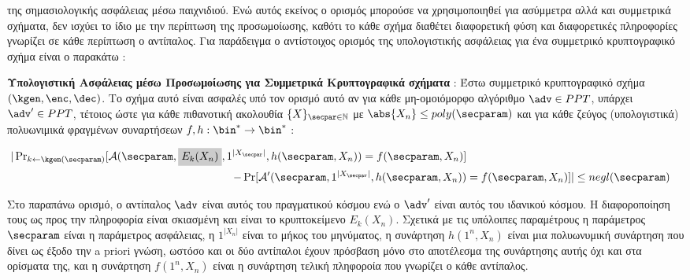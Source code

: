 της σημασιολογικής ασφάλειας μέσω παιχνιδιού. Ενώ αυτός εκείνος ο ορισμός μπορούσε να χρησιμοποιηθεί για ασύμμετρα αλλά και συμμετρικά σχήματα, δεν ισχύει το ίδιο με την περίπτωση της προσωμοίωσης, καθότι το κάθε σχήμα διαθέτει διαφορετική φύση και διαφορετικές πληροφορίες γνωρίζει σε κάθε περίπτωση ο αντίπαλος. Για παράδειγμα ο αντίστοιχος ορισμός της υπολογιστικής ασφάλειας για ένα συμμετρικό κρυπτογραφικό σχήμα είναι ο παρακάτω :

\begin{definition}
    \label{def:simulation_security_symmetric_scheme}
    \textbf{Υπολογιστική Ασφάλειας μέσω Προσωμοίωσης για Συμμετρικά Κρυπτογραφικά σχήματα} :  Έστω συμμετρικό κρυπτογραφικό σχήμα $(\kgen, \enc, \dec)$. Το σχήμα αυτό είναι ασφαλές υπό τον ορισμό αυτό αν για κάθε μη-ομοιόμορφο αλγόριθμο $\adv \in PPT$, υπάρχει $\adv' \in PPT$, τέτοιος ώστε για κάθε πιθανοτική ακολουθία $\{X\}_{\secpar \in \mathbb{N}}$  με $\abs{X_n} \le poly(\secparam)$ και για κάθε ζεύγος (υπολογιστικά) πολυωνιμικά φραγμένων συναρτήσεων $f, h : \bin^* \rightarrow \bin^*$ :

    $$
    \begin{aligned}
    |\operatorname{Pr}_{k \leftarrow \kgen(\secparam)}[\mathcal{A}(\secparam, \highlight{Light-gray}{E_{k}(X_{n})}, 1^{|X_{\secpar}|}, h(\secparam, X_{n})) = f(\secparam, X_{n})] \\
    - \operatorname{Pr}[\mathcal{A}'(\secparam, 1^{|X_{\secpar}|}, h(\secparam, X_{n})) &= f(\secparam, X_{n})]| \le negl(\secparam)
    \end{aligned}
    $$
\end{definition}

Στο παραπάνω ορισμό, ο αντίπαλος $\adv$ είναι αυτός του πραγματικού κόσμου ενώ ο $\adv'$ είναι αυτός του ιδανικού κόσμου. Η διαφοροποίηση τους ως προς την πληροφορία είναι σκιασμένη και είναι το κρυπτοκείμενο $E_k(X_n)$. Σχετικά με τις υπόλοιπες παραμέτρους η παράμετρος $\secparam$ είναι η παράμετρος ασφάλειας, η $1^{|X_n|}$ είναι το μήκος του μηνύματος, η συνάρτηση $h(1^n, X_n)$ είναι μια πολυωνυμική συνάρτηση που δίνει ως έξοδο την a priori γνώση, ωστόσο και οι δύο αντίπαλοι έχουν πρόσβαση μόνο στο αποτέλεσμα της συνάρτησης αυτής όχι και στα ορίσματα της, και η συνάρτηση $f(1^n, X_n)$ είναι η συνάρτηση τελική πληφοροία που γνωρίζει ο κάθε αντίπαλος.

